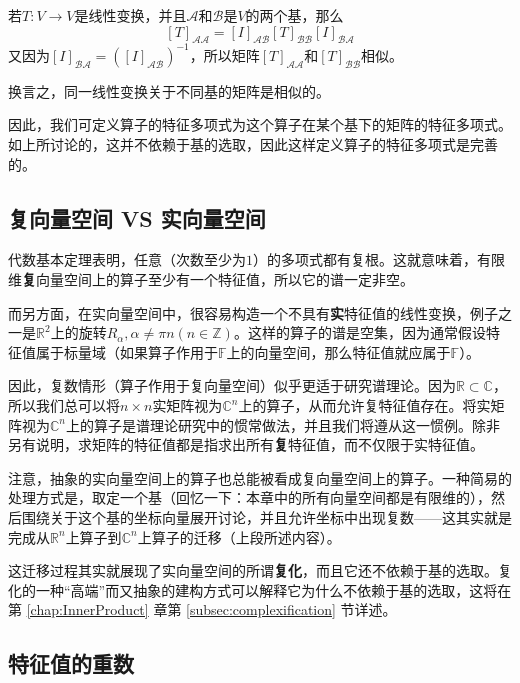 \begin{center}
\end{center}

若$T:V\to V$是线性变换，并且$\mathcal{A}$和$\mathcal{B}$是$V$的两个基，那么\[\left[T\right]_{\mathcal{AA}}=\left[I\right]_{\mathcal{AB}}\left[T\right]_{\mathcal{BB}}\left[I\right]_{\mathcal{BA}}\]
又因为$[I]_{\mathcal{BA}}=([I]_{\mathcal{AB}})^{-1}$，所以矩阵$\left[T\right]_{\mathcal{AA}}$和$\left[T\right]_{\mathcal{BB}}$相似。

换言之，同一线性变换关于不同基的矩阵是相似的。

因此，我们可定义算子的特征多项式为这个算子在某个基下的矩阵的特征多项式。如上所讨论的，这并不依赖于基的选取，因此这样定义算子的特征多项式是完善的。

\subsection{复向量空间 VS 实向量空间}\label{subsec:complex_vs_real}

代数基本定理表明，任意（次数至少为$1$）的多项式都有复根。这就意味着，有限维\textbf{复}向量空间上的算子至少有一个特征值，所以它的谱一定非空。

而另方面，在实向量空间中，很容易构造一个不具有\textbf{实}特征值的线性变换，例子之一是$\mathbb{R}^2$上的旋转$R_\alpha,\alpha\ne \pi n(n\in \mathbb{Z})$。这样的算子的谱是空集，因为通常假设特征值属于标量域（如果算子作用于$\mathbb{F}$上的向量空间，那么特征值就应属于$\mathbb{F}$）。

因此，复数情形（算子作用于复向量空间）似乎更适于研究谱理论。因为$\mathbb{R}\subset\mathbb{C}$，所以我们总可以将$n\times n$实矩阵视为$\mathbb{C}^n$上的算子，从而允许复特征值存在。将实矩阵视为$\mathbb{C}^n$上的算子是谱理论研究中的惯常做法，并且我们将遵从这一惯例。除非另有说明，求矩阵的特征值都是指求出所有\textbf{复}特征值，而不仅限于实特征值。

注意，抽象的实向量空间上的算子也总能被看成复向量空间上的算子。一种简易的处理方式是，取定一个基（回忆一下：本章中的所有向量空间都是有限维的），然后围绕关于这个基的坐标向量展开讨论，并且允许坐标中出现复数——这其实就是完成从$\mathbb{R}^n$上算子到$\mathbb{C}^n$上算子的迁移（上段所述内容）。

这迁移过程其实就展现了实向量空间的所谓\textbf{复化}，而且它还不依赖于基的选取。复化的一种“高端”而又抽象的建构方式可以解释它为什么不依赖于基的选取，这将在第 \ref{chap:InnerProduct} 章第 \ref{subsec:complexification} 节详述。

\subsection{特征值的重数}

